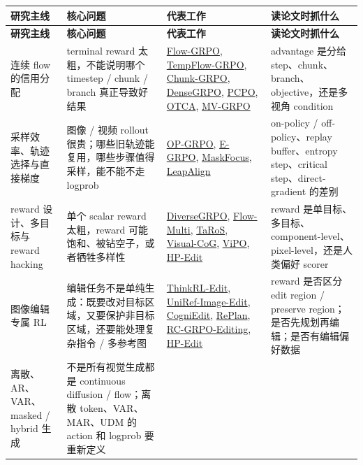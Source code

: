 {\small
\begin{longtable}{p{2.45cm}p{3.7cm}p{5.8cm}p{3.3cm}}
\hline
\textbf{研究主线} & \textbf{核心问题} & \textbf{代表工作} & \textbf{读论文时抓什么} \\
\hline
\endfirsthead
\hline
\textbf{研究主线} & \textbf{核心问题} & \textbf{代表工作} & \textbf{读论文时抓什么} \\
\hline
\endhead
连续 flow 的信用分配
&
terminal reward 太粗，不能说明哪个 timestep / chunk / branch 真正导致好结果
&
\href{https://arxiv.org/abs/2505.05470}{Flow-GRPO},
\href{https://arxiv.org/abs/2508.04324}{TempFlow-GRPO},
\href{https://arxiv.org/abs/2510.21583}{Chunk-GRPO},
\href{https://arxiv.org/abs/2601.20218}{DenseGRPO},
\href{https://arxiv.org/abs/2509.25774}{PCPO},
\href{https://arxiv.org/abs/2604.19234}{OTCA},
\href{https://arxiv.org/abs/2603.12648}{MV-GRPO}
&
advantage 是分给 step、chunk、branch、objective，还是多视角 condition
\\
\hline
采样效率、轨迹选择与直接梯度
&
图像 / 视频 rollout 很贵；哪些旧轨迹能复用，哪些步骤值得采样，能不能不走 logprob
&
\href{https://arxiv.org/abs/2604.04142}{OP-GRPO},
\href{https://arxiv.org/abs/2601.00423}{E-GRPO},
\href{https://arxiv.org/abs/2512.18766}{MaskFocus},
\href{https://arxiv.org/abs/2604.15311}{LeapAlign}
&
on-policy / off-policy、replay buffer、entropy step、critical step、direct-gradient 的差别
\\
\hline
reward 设计、多目标与 reward hacking
&
单个 scalar reward 太粗，reward 可能饱和、被钻空子，或者牺牲多样性
&
\href{https://arxiv.org/abs/2512.21514}{DiverseGRPO},
\href{https://www.mdpi.com/1424-8220/26/4/1120}{Flow-Multi},
\href{https://arxiv.org/abs/2511.19356}{TaRoS},
\href{https://arxiv.org/abs/2508.18032}{Visual-CoG},
\href{https://arxiv.org/abs/2511.18719}{ViPO},
\href{https://arxiv.org/abs/2604.19406}{HP-Edit}
&
reward 是单目标、多目标、component-level、pixel-level，还是人类偏好 scorer
\\
\hline
图像编辑专属 RL
&
编辑任务不是单纯生成：既要改对目标区域，又要保护非目标区域，还要能处理复杂指令 / 多参考图
&
\href{https://arxiv.org/abs/2601.03467}{ThinkRL-Edit},
\href{https://arxiv.org/abs/2602.14186}{UniRef-Image-Edit},
\href{https://arxiv.org/abs/2512.13276}{CogniEdit},
\href{https://arxiv.org/abs/2512.16864}{RePlan},
\href{https://arxiv.org/abs/2604.09386}{RC-GRPO-Editing},
\href{https://arxiv.org/abs/2604.19406}{HP-Edit}
&
reward 是否区分 edit region / preserve region；是否先规划再编辑；是否有编辑偏好数据
\\
\hline
离散、AR、VAR、masked / hybrid 生成
&
不是所有视觉生成都是 continuous diffusion / flow；离散 token、VAR、MAR、UDM 的 action 和 logprob 要重新定义

\end{longtable}}
